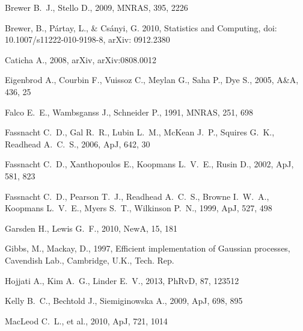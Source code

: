 \documentclass[useAMS,usenatbib, a4paper]{mn2e} \usepackage{natbib}
\begin{document}
\begin{thebibliography}{99} 
 Brewer B.~J., Stello D., 2009, MNRAS, 395, 2226

Brewer, B., P\'{a}rtay, L., \& Cs\'{a}nyi, G. 2010, Statistics and Computing, doi: 10.1007/s11222-010-9198-8, arXiv: 0912.2380

Caticha A., 2008, arXiv, arXiv:0808.0012 

 Eigenbrod A., Courbin F., Vuissoz C., Meylan G., Saha P., Dye S., 2005, A\&A, 436, 25 

 Falco E.~E., Wambsganss J., Schneider P., 1991, MNRAS, 251, 698 

 Fassnacht C.~D., Gal R.~R., Lubin L.~M., 
McKean J.~P., Squires G.~K., Readhead A.~C.~S., 2006, ApJ, 642, 30 

 Fassnacht C.~D., Xanthopoulos E., Koopmans 
L.~V.~E., Rusin D., 2002, ApJ, 581, 823 

 Fassnacht C.~D., Pearson T.~J., Readhead 
A.~C.~S., Browne I.~W.~A., Koopmans L.~V.~E., Myers S.~T., Wilkinson P.~N., 
1999, ApJ, 527, 498 

 Garsden H., Lewis G.~F., 2010, NewA, 15, 181 

Gibbs, M., Mackay, D., 1997, Efficient implementation of Gaussian processes, Cavendish Lab., Cambridge, U.K., Tech. Rep.

 Hojjati A., Kim A.~G., Linder E.~V., 2013, PhRvD, 87, 123512 

 Kelly B.~C., Bechtold J., Siemiginowska A., 2009, ApJ, 698, 895 

 MacLeod C.~L., et al., 2010, ApJ, 721, 
1014 


\end{thebibliography}
\end{document}
